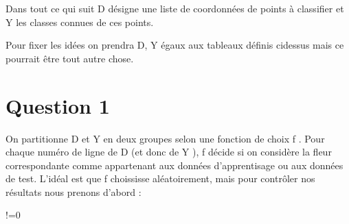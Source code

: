\documentclass[letterpaper,10pt,english]{jupyterBook}
\begin{document}
\sphinxAtStartPar
{}

\sphinxAtStartPar
Dans tout ce qui suit D désigne une liste de coordonnées de points à classifier et Y les classes connues de ces points.

\sphinxAtStartPar
Pour fixer les idées on prendra D, Y égaux aux tableaux définis ci\sphinxhyphen{}dessus mais ce pourrait être tout autre chose.


\section{Question 1}
\label{\detokenize{notebooks/Machine-Learning/TP-Iris:question-1}}
\sphinxAtStartPar
On partitionne D et Y en deux groupes selon une fonction de choix f . Pour chaque numéro de ligne de D (et donc de Y ), f décide si on considère la fleur correspondante comme appartenant aux données d’apprentisage ou aux données de test. L’idéal est que f choississe aléatoirement, mais pour contrôler nos résultats nous prenons d’abord :
\begin{sphinxVerbatimInput}

\begin{sphinxVerbatim}[commandchars=\\\{\}]
 !=0
\end{sphinxVerbatim}
\end{sphinxVerbatimInput}
\begin{sphinxVerbatimInput}

\begin{sphinxVerbatim}[commandchars=\\\{\}]
 
    \PYG{p}{[}\PYG{p}{]}\PYG{p}{[}\PYG{p}{]}\PYG{p}{[}\PYG{p}{]}\PYG{p}{[}\PYG{p}{]}
       
         
            \PYG{p}{[}\PYG{p}{]}\PYG{p}{[}\PYG{p}{]}
            \PYG{p}{[}\PYG{p}{]}\PYG{p}{[}\PYG{p}{]}
     
\end{sphinxVerbatim}
\end{sphinxVerbatimInput}
\end{document}
